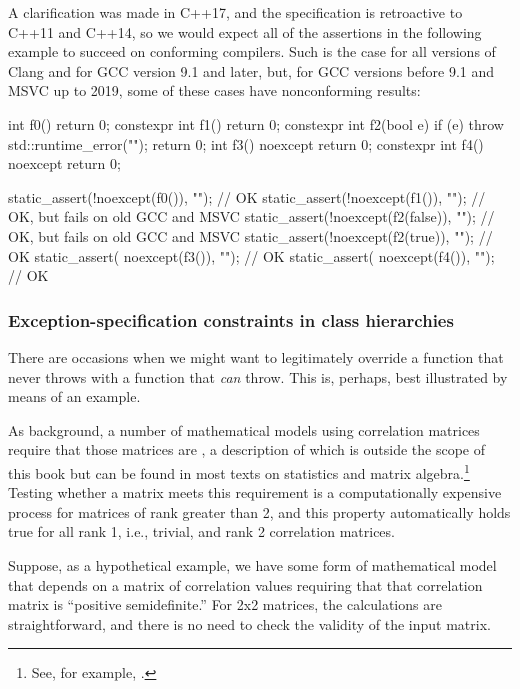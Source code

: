 A clarification was made in C++17, and the specification is retroactive
to C++11 and C++14, so we would expect all of the assertions in the
following example to succeed on conforming compilers. Such is the case
for all versions of Clang and for GCC version 9.1 and later, but, for
GCC versions before 9.1 and MSVC up to 2019, some of these cases have
nonconforming results:

\begin{emcppslisting}
          int f0()          { return 0; }
constexpr int f1()          { return 0; }
constexpr int f2(bool e)    { if (e) throw std::runtime_error(""); return 0; }
          int f3() noexcept { return 0; }
constexpr int f4() noexcept { return 0; }

static_assert(!noexcept(f0()),      "");  // OK
static_assert(!noexcept(f1()),      "");  // OK, but fails on old GCC and MSVC
static_assert(!noexcept(f2(false)), "");  // OK, but fails on old GCC and MSVC
static_assert(!noexcept(f2(true)),  "");  // OK
static_assert( noexcept(f3()),      "");  // OK
static_assert( noexcept(f4()),      "");  // OK
\end{emcppslisting}
    

\subsubsection[Exception-specification constraints in class hierarchies]{Exception-specification constraints in class hierarchies}\label{exception-specification-constraints-in-class-hierarchies}

There are occasions when we might want to legitimately override a
function that never throws with a function that \emph{can} throw. This
is, perhaps, best illustrated by means of an example.

As background, a number of mathematical models using correlation
matrices require that those matrices are ,
a description of which is outside the scope of this book but can be
found in most texts on statistics and matrix algebra.\footnote{See, for example, \cite{vandenbos17}.} Testing
whether a matrix meets this requirement is a computationally expensive
process for matrices of rank greater than 2, and this property
automatically holds true for all rank 1, i.e., trivial, and rank 2
correlation matrices.

Suppose, as a hypothetical example, we have some form of mathematical
model that depends on a matrix of correlation values requiring that that
correlation matrix is ``positive semidefinite.'' For 2x2 matrices, the
calculations are straightforward, and there is no need to check the
validity of the input matrix.

